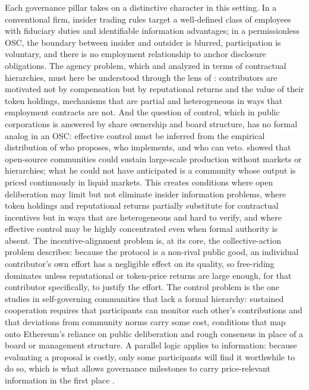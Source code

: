 \documentclass[No]{AEA}
\begin{document}
Each governance pillar takes on a distinctive character in this setting. In a conventional firm, insider trading rules target a well-defined class of employees with fiduciary duties and identifiable information advantages; in a permissionless OSC, the boundary between insider and outsider is blurred, participation is voluntary, and there is no employment relationship to anchor disclosure obligations. The agency problem, which \cite{Coase1937} and \cite{JensenMeckling1976} analyzed in terms of contractual hierarchies, must here be understood through the lens of \cite{LernerTirole2005}: contributors are motivated not by compensation but by reputational returns and the value of their token holdings, mechanisms that are partial and heterogeneous in ways that employment contracts are not. And the question of control, which in public corporations is answered by share ownership and board structure, has no formal analog in an OSC: effective control must be inferred from the empirical distribution of who proposes, who implements, and who can veto. \cite{Benkler2002} showed that open-source communities could sustain large-scale production without markets or hierarchies; what he could not have anticipated is a community whose output is priced continuously in liquid markets. This creates conditions where open deliberation may limit but not eliminate insider information problems, where token holdings and reputational returns partially substitute for contractual incentives but in ways that are heterogeneous and hard to verify, and where effective control may be highly concentrated even when formal authority is absent. The incentive-alignment problem is, at its core, the collective-action problem \cite{Olson1965} describes: because the protocol is a non-rival public good, an individual contributor's own effort has a negligible effect on its quality, so free-riding dominates unless reputational or token-price returns are large enough, for that contributor specifically, to justify the effort. The control problem is the one \cite{Ostrom1990} studies in self-governing communities that lack a formal hierarchy: sustained cooperation requires that participants can monitor each other's contributions and that deviations from community norms carry some cost, conditions that map onto Ethereum's reliance on public deliberation and rough consensus in place of a board or management structure. A parallel logic applies to information: because evaluating a proposal is costly, only some participants will find it worthwhile to do so, which is what allows governance milestones to carry price-relevant information in the first place \citep{GrossmanStiglitz1980}.
\end{document}
